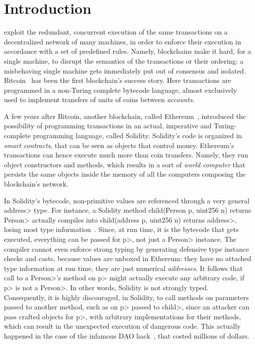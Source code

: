 \section{Introduction}\label{sec:introduction}

 exploit the redundant, concurrent execution of the same
transactions on a decentralized network of many machines,
in order to enforce their execution in accordance with
a set of predefined rules. Namely, blockchains make it hard, for a single machine,
to disrupt the semantics of the transactions or their ordering: a misbehaving single machine
gets immediately put out of consensus and isolated. Bitcoin~\cite{Nakamoto08,book-mastering-bitcoin}
has been the first blockchain's success story. Here
transactions are programmed in a non-Turing complete bytecode language,
almost exclusively used to implement transfers of units of coins between \emph{accounts}.

A few years after Bitcoin, another blockchain, called
Ethereum~\cite{Buterin13,AntonopoulosW18}, introduced the possibility of programming
transactions in an actual, imperative and Turing-complete programming language, called Solidity.
Solidity's code is organized in \emph{smart contracts}, that can be seen as
objects that control money. 
Ethereum's transactions can hence execute much more than coin transfers. Namely,
they run object constructors and methods, which results in a sort
of \emph{world computer} that persists the same objects inside the memory of all the
computers composing the blockchain's network.

In Solidity's bytecode,
non-primitive values are referenced through a very general
\<address> type. For instance, a Solidity method
\<child(Person p, uint256 n) returns Person> actually compiles
into \<child(address p, uint256 n) returns address>, losing most
type information~\cite{CrafaPZ19}.
Since, at run time, it is the bytecode that gets executed,
everything can be passed for \<p>, not just a \<Person> instance.
The compiler cannot even enforce strong typing
by generating defensive type instance checks and casts, because
values are unboxed in Ethereum: they have no attached
type information at run time,
they are just numerical \emph{addresses}.
It follows that  call to a \<Person>'s method
on \<p> might actually execute any arbitrary code, if \<p> is not a \<Person>.
In other words, Solidity is not strongly typed.
Consequently, it is highly discouraged, in Solidity, to call methods on parameters passed
to another method, such as on \<p> passed to \<child>, since an attacker can pass crafted
objects for \<p>, with arbitrary implementations for their methods,
which can result in the unexpected execution of
dangerous code. This actually happened in the case of the infamous DAO hack~\cite{dao16}, that
costed millions of dollars.

